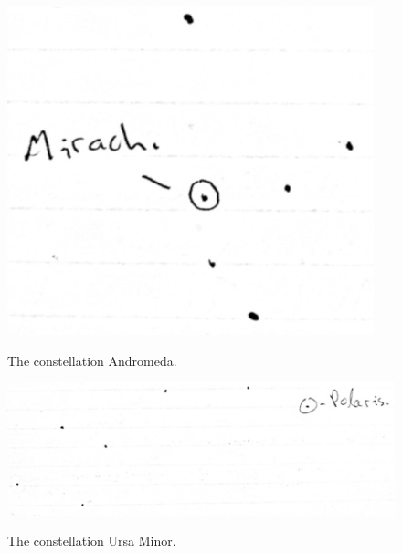 \documentclass[11pt]{article}
\begin{document}
\begin{figure}[H]
\caption{The constellation Andromeda.}
\begin{center}
\includegraphics[scale=0.7]{figures/andromeda.jpg}
\label{fig:andromeda}
\end{center}
\end{figure}

\begin{figure}[H]
\caption{The constellation Ursa Minor.}
\begin{center}
\includegraphics[scale=0.6]{figures/ursaminor.jpg}
\label{fig:ursaminor}
\end{center}
\end{figure}
\end{document}
